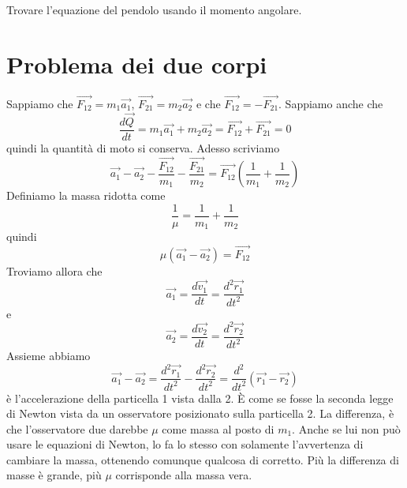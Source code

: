 \documentclass[a4paper]{article}
\begin{document}
%
%

\pagebreak

Trovare l'equazione del pendolo usando il momento angolare.

\section{Problema dei due corpi}

Sappiamo che \(\vec{F_{12}} = m_1\vec{a_1}\), \(\vec{F_{21}} = m_2\vec{a_2}\)
e che \(\vec{F_{12}} = -\vec{F_{21}}\).
Sappiamo anche che
\[
    \frac{d\vec{Q}}{dt} = m_1\vec{a_1} + m_2\vec{a_2} =\vec{F_{12}} + \vec{F_{21}} = 0
\]
quindi la quantità di moto si conserva.
Adesso scriviamo
\[
    \vec{a_1} - \vec{a_2} - \frac{\vec{F_{12}}}{m_1}
    - \frac{\vec{F_{21}}}{m_2} = \vec{F_{12}} \left(\frac{1}{m_1} + \frac{1}{m_2}\right)
\]
Definiamo la massa ridotta come
\[
    \frac{1}{\mu} = \frac{1}{m_1} + \frac{1}{m_2}
\]
quindi
\[
    \mu(\vec{a_1} - \vec{a_2}) = \vec{F_{12}}
\]
Troviamo allora che
\[
    \vec{a_1} = \frac{d\vec{v_1}}{dt} = \frac{d^2 \vec{r_1}}{dt^2}
\]
e
\[
    \vec{a_2} = \frac{d\vec{v_2}}{dt} = \frac{d^2 \vec{r_2}}{dt^2}
\]
Assieme abbiamo
\[
    \vec{a_1} - \vec{a_2} = \frac{d^2 \vec{r_1}}{dt^2} - \frac{d^2 \vec{r_2}}{dt^2}
    = \frac{d^2}{dt^2} \left(\vec{r_1} - \vec{r_2}\right)
\]
è l'accelerazione della particella 1 vista dalla 2.
È come se fosse la seconda legge di Newton vista da un osservatore posizionato sulla particella 2.
La differenza, è che l'osservatore due darebbe \(\mu\) come massa al posto di \(m_1\).
Anche se lui non può usare le equazioni di Newton, lo fa lo stesso con solamente l'avvertenza di cambiare
la massa, ottenendo comunque qualcosa di corretto.
Più la differenza di masse è grande, più \(\mu\) corrisponde alla massa vera.
\end{document}
